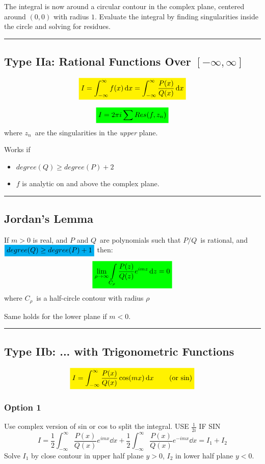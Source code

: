 \documentclass[10pt,a4paper]{article}
\renewcommand{\exp}{e^}
\newcommand{\infint}{\int_{-\infty}^{\infty}}
\newcommand{\holine}[1][\medskipamount]{\par\vspace*{\dimexpr-\parskip-\baselineskip+#1}\noindent\rule{\linewidth}{1pt}\par\vspace*{\dimexpr-\parskip-.5\baselineskip+#1}}
\newcommand{\half}{\frac{1}{2}}
\newcommand{\yl}[1]{\colorbox{yellow}{$\displaystyle #1$}}
\newcommand{\gr}[1]{\colorbox{green}{$\displaystyle #1$}}
\newcommand{\bl}[1]{\colorbox{cyan}{$\displaystyle #1$}}
\begin{document}
\begin{multicols}{2}
The integral is now around a circular contour in the complex plane, centered around $(0,0)$ with radius $1$. Evaluate the integral by finding singularities inside the circle and solving for residues.




\holine
\subsection*{Type IIa: Rational Functions Over $[-\infty, \infty]$}
\[\yl{
    I = \int_{-\infty}^\infty f(x) \dd{x} = \int_{-\infty}^\infty \dfrac{P(x)}{Q(x)} \dd{x}
}\]

\[\gr{
    I = 2\pi i \sum Res(f, z_n)
}\]
where $z_n$ are the singularities in the \textit{upper} plane.

Works if
\begin{itemize}
    \item $degree(Q) \geq degree(P) + 2$
    \item $f$ is analytic on and above the complex plane.
\end{itemize}



\holine
\subsection*{Jordan's Lemma}
If $m>0$ is real, and $P$ and $Q$ are polynomials such that $P/Q$ is rational, and $\bl{degree(Q) \geq degree(P) + 1}$ then:
\[\gr{
    \lim\limits_{\rho\rightarrow\infty}\int\limits_{C_\rho} \frac{P(z)}{Q(z)}\exp{imz} \dd{z} = 0
}\]
where $C_\rho$ is a half-circle contour with radius $\rho$

Same holds for the lower plane if $m<0$.


\holine
\subsection*{Type IIb: ... with Trigonometric Functions}
\[\yl{
    I = \int_{-\infty}^\infty \dfrac{P(x)}{Q(x)}\cos(m x) \dd{x} \quad\quad \text{(or sin)}
}\]
\subsubsection*{Option 1}
Use complex version of sin or cos to split the integral. USE $\frac{1}{2i}$ IF SIN
\[I = \half \infint \frac{P(x)}{Q(x)}\exp{imx} \dd x + \half \infint \frac{P(x)}{Q(x)}\exp{-imx} \dd x = I_1 + I_2\]
Solve $I_1$ by close contour in upper half plane $y>0$, $I_2$ in lower half plane $y<0$.

\end{multicols}
\end{document}
